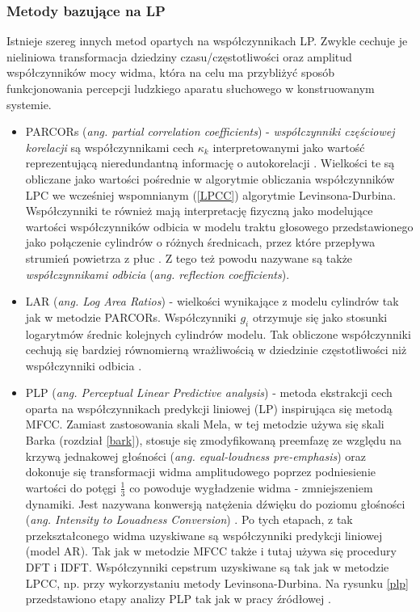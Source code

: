 \subsubsection{Metody bazujące na LP}
Istnieje szereg innych metod opartych na współczynnikach LP. Zwykle cechuje je nieliniowa transformacja dziedziny czasu/częstotliwości oraz amplitud współczynników mocy widma, która na celu ma przybliżyć sposób funkcjonowania percepcji ludzkiego aparatu słuchowego w konstruowanym systemie. 
\begin{itemize}
  \item{PARCORs (\textit{ang. partial correlation coefficients})} - \textit{współczynniki częściowej korelacji} są współczynnikami cech $\kappa_k$ interpretowanymi jako wartość reprezentującą nieredundantną informację o autokorelacji \cite{fosr}. Wielkości te są obliczane jako wartości pośrednie w algorytmie obliczania współczynników LPC we wcześniej wspomnianym (\ref{LPCC}) algorytmie Levinsona-Durbina. Współczynniki te również mają interpretację fizyczną jako modelujące wartości współczynników odbicia w modelu traktu głosowego przedstawionego jako połączenie cylindrów o różnych średnicach, przez które przepływa strumień powietrza z płuc \cite{fosr}. Z tego też powodu nazywane są także \textit{współczynnikami odbicia} (\textit{ang. reflection coefficients}).

  \item{LAR (\textit{ang. Log Area Ratios})} - wielkości wynikające z modelu cylindrów tak jak w metodzie PARCORs. Współczynniki $ g_i $ otrzymuje się jako stosunki logarytmów średnic kolejnych cylindrów modelu. Tak obliczone współczynniki cechują się bardziej równomierną wrażliwością w dziedzinie częstotliwości niż współczynniki odbicia \cite{campbell}.

  \item{PLP (\textit{ang. Perceptual Linear Predictive analysis})\label{plp}} - metoda ekstrakcji cech oparta na współczynnikach predykcji liniowej (LP) inspirująca się metodą MFCC. Zamiast zastosowania skali Mela, w tej metodzie używa się skali Barka (rozdział \ref{bark}), stosuje się zmodyfikowaną preemfazę ze względu na krzywą jednakowej głośności (\textit{ang. equal-loudness pre-emphasis}) oraz dokonuje się transformacji widma amplitudowego poprzez podniesienie wartości do potęgi $\frac{1}{3}$ co powoduje wygładzenie widma - zmniejszeniem dynamiki. Jest nazywana konwersją natężenia dźwięku do poziomu głośności (\textit{ang. Intensity to Louadness Conversion}) \cite{hoening}. Po tych etapach, z tak przekształconego widma uzyskiwane są współczynniki predykcji liniowej (model AR). Tak jak w metodzie MFCC także i tutaj używa się procedury DFT i IDFT. Współczynniki cepstrum uzyskiwane są tak jak w metodzie LPCC, np. przy wykorzystaniu metody Levinsona-Durbina. Na rysunku \ref{plp} przedstawiono etapy analizy PLP tak jak w pracy źródłowej \cite{fosr30hermansky}.


\end{itemize}
